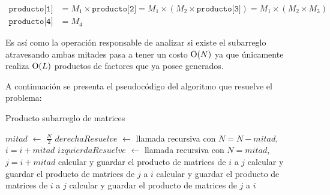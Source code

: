 \begin{align*}
	\texttt{producto[1]} &= M_1 \times \texttt{producto[2]} =
	M_1 \times \left(M_2 \times \texttt{producto[3]}\right) =
	M_1 \times \left(M_2 \times M_3\right) \\
	\texttt{producto[4]} &= M_4
\end{align*}

Es así como la operación responsable de analizar si existe el subarreglo
atravesando ambas mitades pasa a tener un costo $\operatorname{O}(N)$ ya que únicamente
realiza $\operatorname{O}(L)$ productos de factores que ya posee generados.

A continuación se presenta el pseudocódigo del algoritmo que resuelve el problema:

\begin{algorithm}[H]
	\caption{Producto subarreglo de matrices}
	 {
		 {
			 \;
		}
	}
	{
		 {
			$mitad$ $\gets$ $\frac{N}{2}$ \;
			$derechaResuelve$ $\gets$ llamada recursiva con $N = N - mitad$, $i =
			i + mitad$ \;
			$izquierdaResuelve$ $\gets$ llamada recursiva con $N = mitad$, $j = i
			+ mitad$ \;
			 {
				 \;
			}
			{
				 {
					 \;
				}
				{
					 {
						calcular y guardar el producto de matrices de $i$ a $j$ \;
					}
					{
						calcular y guardar el producto de matrices de $j$ a $i$ \;
					}
				}
			}
		}
		{
			 {
				calcular y guardar el producto de matrices de $i$ a $j$ \;
			}
			{
				calcular y guardar el producto de matrices de $j$ a $i$ \;
			}
		}
	}

	 \;
\end{algorithm}


